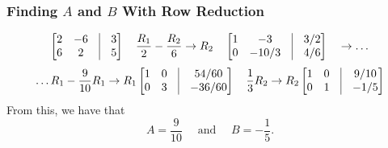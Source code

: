 \documentclass[a4paper,12pt]{article} %
\begin{document}
\subsubsection*{Finding $A$ and $B$ With Row Reduction}
$$\begin{bmatrix}
	2 & -6 & \vline & 3 \\
	6 & 2  & \vline & 5
\end{bmatrix} \quad \frac{R_1}{2} -\frac{R_2}{6} \rightarrow  R_2\quad 
\begin{bmatrix} 
	1 & -3 & \vline & 3/2 \\
	0 & -10/3  & \vline & 4/6
\end{bmatrix} \quad\rightarrow \ldots
$$
$$ \ldots R_1 - \frac{9}{10}R_1 \rightarrow  R_1 
\begin{bmatrix} 
	1 & 0 & \vline & 54/60 \\
	0 & 3  & \vline & -36/60
\end{bmatrix} \quad \frac{1}{3}R_2 \rightarrow  R_2
\begin{bmatrix} 
	1 & 0 & \vline & 9/10 \\
	0 & 1  & \vline & -1/5
\end{bmatrix}
$$
From this, we have that
$$\boxed{ A = \frac{9}{10} \quad\text{ and }\quad B = -\frac{1}{5}.} $$
\end{document}
